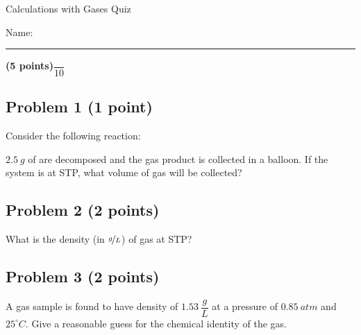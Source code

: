 \documentclass[12pt, letterpaper]{memoir}
\begin{document}
	\begin{center}
		{\large Calculations with Gases Quiz}
	\end{center}
	{\large Name: \rule[-1mm]{4in}{.1pt} {\bfseries (5 points)}\hspace{4em}$\dfrac{~}{10}$} 
	
	\subsection*{Problem 1 (1 point)}
	Consider the following reaction: 
	
	\noindent $2.5~g$ of  are decomposed and the gas product is collected in a balloon. If the system is at STP, what volume of gas will be collected?
	
	\vspace{10em}
	\subsection*{Problem 2 (2 points)}
	What is the density (in $\nicefrac{g}{L}$) of  gas at STP?
	
	\vspace{10em}
	\subsection*{Problem 3 (2 points)}
	A gas sample is found to have density of $1.53~\dfrac{g}{L}$ at a pressure of $0.85~atm$ and $25^\circ C$. Give a reasonable guess for the chemical identity of the gas.
\end{document}
